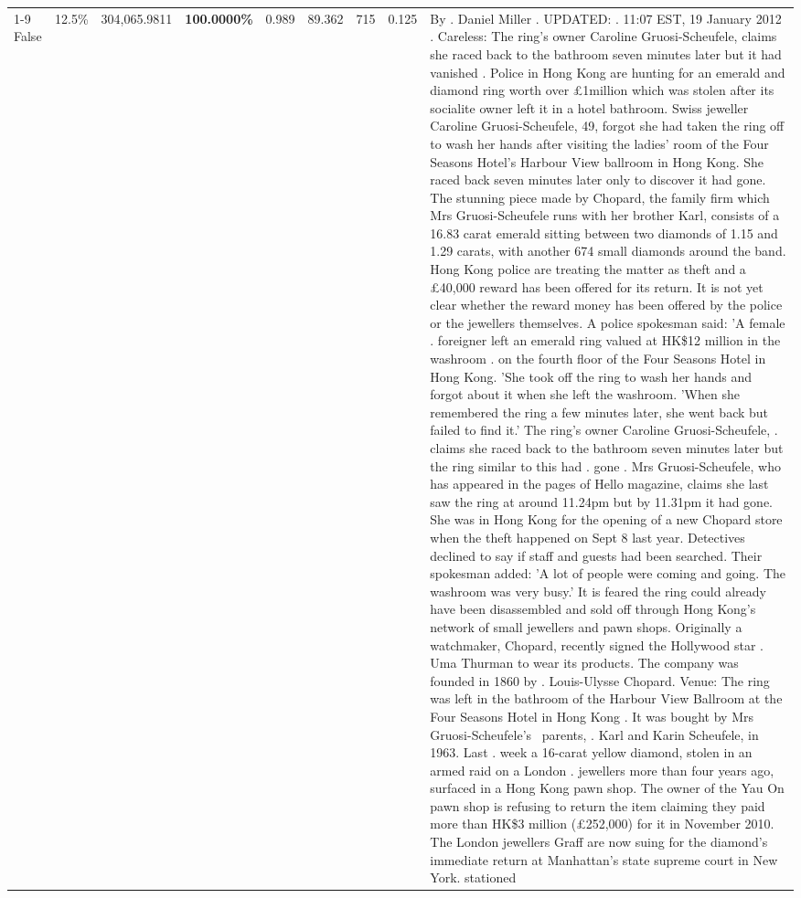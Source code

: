 \begin{table}[H]
\begin{tabular}{lllrlllll}
\cline{1-9} \cline{2-9}
False & 12.5\% & \color{red} 304,065.9811 & \bfseries \color{red} 100.0000\% & 0.989 & 89.362 & 715 & 0.125 & By . Daniel Miller . UPDATED: . 11:07 EST, 19 January 2012 . Careless: The ring's owner Caroline Gruosi-Scheufele, claims she raced back to the bathroom seven minutes later but it had vanished . Police in Hong Kong are hunting for an emerald and diamond ring worth over £1million which was stolen after its socialite owner left it in a hotel bathroom. Swiss jeweller Caroline Gruosi-Scheufele, 49, forgot she had taken the ring off to wash her hands after visiting the ladies' room of the Four Seasons Hotel's Harbour View ballroom in Hong Kong. She raced back seven minutes later only to discover it had gone. The stunning piece made by Chopard, the family firm which Mrs Gruosi-Scheufele runs with her brother Karl, consists of a 16.83 carat emerald sitting between two diamonds of 1.15 and 1.29 carats, with another 674 small diamonds around the band. Hong Kong police are treating the matter as theft and a £40,000 reward has been offered for its return. It is not yet clear whether the reward money has been offered by the police or the jewellers themselves. A police spokesman said: 'A female . foreigner left an emerald ring valued at HK\$12 million in the washroom . on the fourth floor of the Four Seasons Hotel in Hong Kong. 'She took off the ring to wash her hands and forgot about it when she left the washroom. 'When she remembered the ring a few minutes later, she went back but failed to find it.' The ring's owner Caroline Gruosi-Scheufele, . claims she raced back to the bathroom seven minutes later but the ring similar to this had . gone . Mrs Gruosi-Scheufele, who has appeared in the pages of Hello magazine, claims she last saw the ring at around 11.24pm but by 11.31pm it had gone. She was in Hong Kong for the opening of a new Chopard store when the theft happened on Sept 8 last year. Detectives declined to say if staff and guests had been searched. Their spokesman added: 'A lot of people were coming and going. The washroom was very busy.' It is feared the ring could already have been disassembled and sold off through Hong Kong's network of small jewellers and pawn shops. Originally a watchmaker, Chopard, recently signed the Hollywood star . Uma Thurman to wear its products. The company was founded in 1860 by . Louis-Ulysse Chopard. Venue: The ring was left in the bathroom of the Harbour View Ballroom at the Four Seasons Hotel in Hong Kong . It was bought by Mrs Gruosi-Scheufele's  parents, . Karl and Karin Scheufele, in 1963. Last . week a 16-carat yellow diamond, stolen in an armed raid on a London . jewellers more than four years ago, surfaced in a Hong Kong pawn shop. The owner of the Yau On pawn shop is refusing to return the item claiming they paid more than HK\$3 million (£252,000) for it in November 2010. The London jewellers Graff are now suing for the diamond’s immediate return at Manhattan’s state supreme court in New York. stationed \\

\end{tabular}
\end{table}
